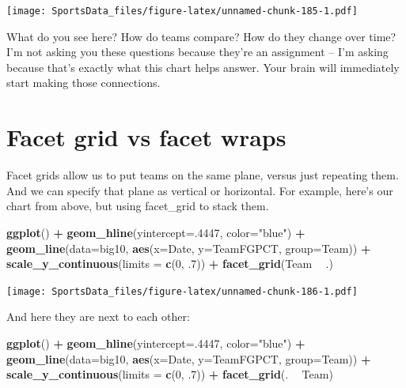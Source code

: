 \documentclass[]{book}
\newenvironment{Shaded}{\begin{snugshade}}{\end{snugshade}}
\newcommand{\DataTypeTok}[1]{\textcolor[rgb]{0.13,0.29,0.53}{#1}}
\newcommand{\DecValTok}[1]{\textcolor[rgb]{0.00,0.00,0.81}{#1}}
\newcommand{\FloatTok}[1]{\textcolor[rgb]{0.00,0.00,0.81}{#1}}
\newcommand{\KeywordTok}[1]{\textcolor[rgb]{0.13,0.29,0.53}{\textbf{#1}}}
\newcommand{\NormalTok}[1]{#1}
\newcommand{\OperatorTok}[1]{\textcolor[rgb]{0.81,0.36,0.00}{\textbf{#1}}}
\newcommand{\StringTok}[1]{\textcolor[rgb]{0.31,0.60,0.02}{#1}}
\begin{document}
\texttt{[image: SportsData\_files/figure-latex/unnamed-chunk-185-1.pdf]}

What do you see here? How do teams compare? How do they change over time? I'm not asking you these questions because they're an assignment -- I'm asking because that's exactly what this chart helps answer. Your brain will immediately start making those connections.

\hypertarget{facet-grid-vs-facet-wraps}{%
\section{Facet grid vs facet wraps}\label{facet-grid-vs-facet-wraps}}

Facet grids allow us to put teams on the same plane, versus just repeating them. And we can specify that plane as vertical or horizontal. For example, here's our chart from above, but using facet\_grid to stack them.

\begin{Shaded}
\begin{Highlighting}[]
\KeywordTok{ggplot}\NormalTok{() }\OperatorTok{+}\StringTok{ }\KeywordTok{geom_hline}\NormalTok{(}\DataTypeTok{yintercept=}\NormalTok{.}\DecValTok{4447}\NormalTok{, }\DataTypeTok{color=}\StringTok{"blue"}\NormalTok{) }\OperatorTok{+}\StringTok{ }\KeywordTok{geom_line}\NormalTok{(}\DataTypeTok{data=}\NormalTok{big10, }\KeywordTok{aes}\NormalTok{(}\DataTypeTok{x=}\NormalTok{Date, }\DataTypeTok{y=}\NormalTok{TeamFGPCT, }\DataTypeTok{group=}\NormalTok{Team)) }\OperatorTok{+}\StringTok{ }\KeywordTok{scale_y_continuous}\NormalTok{(}\DataTypeTok{limits =} \KeywordTok{c}\NormalTok{(}\DecValTok{0}\NormalTok{, }\FloatTok{.7}\NormalTok{)) }\OperatorTok{+}\StringTok{ }\KeywordTok{facet_grid}\NormalTok{(Team }\OperatorTok{~}\StringTok{ }\NormalTok{.)}
\end{Highlighting}
\end{Shaded}

\texttt{[image: SportsData\_files/figure-latex/unnamed-chunk-186-1.pdf]}

And here they are next to each other:

\begin{Shaded}
\begin{Highlighting}[]
\KeywordTok{ggplot}\NormalTok{() }\OperatorTok{+}\StringTok{ }\KeywordTok{geom_hline}\NormalTok{(}\DataTypeTok{yintercept=}\NormalTok{.}\DecValTok{4447}\NormalTok{, }\DataTypeTok{color=}\StringTok{"blue"}\NormalTok{) }\OperatorTok{+}\StringTok{ }\KeywordTok{geom_line}\NormalTok{(}\DataTypeTok{data=}\NormalTok{big10, }\KeywordTok{aes}\NormalTok{(}\DataTypeTok{x=}\NormalTok{Date, }\DataTypeTok{y=}\NormalTok{TeamFGPCT, }\DataTypeTok{group=}\NormalTok{Team)) }\OperatorTok{+}\StringTok{ }\KeywordTok{scale_y_continuous}\NormalTok{(}\DataTypeTok{limits =} \KeywordTok{c}\NormalTok{(}\DecValTok{0}\NormalTok{, }\FloatTok{.7}\NormalTok{)) }\OperatorTok{+}\StringTok{ }\KeywordTok{facet_grid}\NormalTok{(. }\OperatorTok{~}\StringTok{ }\NormalTok{Team)}
\end{Highlighting}
\end{Shaded}
\end{document}
